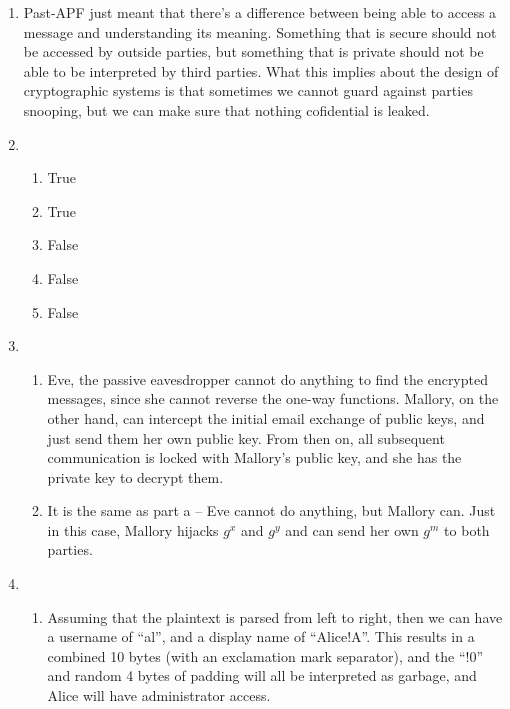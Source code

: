 
\usepackage{amsmath, dsfont, mathtools, verbatim, tikz, float}

\usetikzlibrary{arrows,automata}

\oddsidemargin 0in
\evensidemargin 0in
\textwidth 6.5in
\topmargin -0.5in
\textheight 9.0in
\newcommand{\norm}[1]{\left\lVert #1 \right\rVert}
\newcommand{\?}{\stackrel{?}{=}}
\DeclarePairedDelimiter{\ceil}{\lceil}{\rceil}



\pagestyle{myheadings}

\begin{enumerate}
  \item
    Past-APF just meant that there's a difference between being able to access a message and understanding its meaning. Something that is secure should not be accessed by outside parties, but something that is private should not be able to be interpreted by third parties. What this implies about the design of cryptographic systems is that sometimes we cannot guard against parties snooping, but we can make sure that nothing cofidential is leaked. \newpage
  \item
    \begin{enumerate}
    \item True
    \item True
    \item False
    \item False
    \item False \newpage
    \end{enumerate}

  \item 
    \begin{enumerate}
      \item Eve, the passive eavesdropper cannot do anything to find the encrypted messages, since she cannot reverse the one-way functions. Mallory, on the other hand, can intercept the initial email exchange of public keys, and just send them her own public key. From then on, all subsequent communication is locked with Mallory's public key, and she has the private key to decrypt them.

      \item It is the same as part a -- Eve cannot do anything, but Mallory can. Just in this case, Mallory hijacks $g^x$ and $g^y$ and can send her own $g^m$ to both parties. \newpage
    \end{enumerate}


  \item 
    \begin{enumerate}
      \item
        Assuming that the plaintext is parsed from left to right, then we can have a username of ``al'', and a display name of ``Alice!A''. This results in a combined 10 bytes (with an exclamation mark separator), and the ``!0'' and random 4 bytes of padding will all be interpreted as garbage, and Alice will have administrator access.


\end{enumerate}
\end{enumerate}
